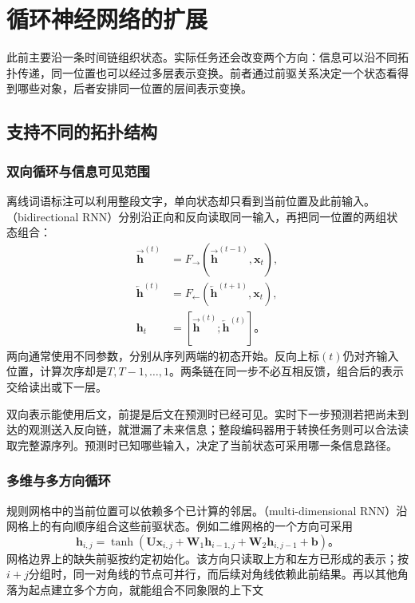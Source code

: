 \section{循环神经网络的扩展}
\label{sec:rnn-extensions}

此前主要沿一条时间链组织状态。实际任务还会改变两个方向：信息可以沿不同拓扑传递，同一位置也可以经过多层表示变换。前者通过前驱关系决定一个状态看得到哪些对象，后者安排同一位置的层间表示变换。

\subsection{支持不同的拓扑结构}
\label{sec:rnn-topologies}

\subsubsection{双向循环与信息可见范围}
\label{sec:rnn-bidirectional}

离线词语标注可以利用整段文字，单向状态却只看到当前位置及此前输入。（bidirectional RNN）分别沿正向和反向读取同一输入，再把同一位置的两组状态组合：
\begin{equation}
  \begin{aligned}
    \overrightarrow{\bm{h}}^{(t)}&=F_{\rightarrow}\!\left(
       \overrightarrow{\bm{h}}^{(t-1)},\bm{x}_t\right),\\
    \overleftarrow{\bm{h}}^{(t)}&=F_{\leftarrow}\!\left(
       \overleftarrow{\bm{h}}^{(t+1)},\bm{x}_t\right),\\
    \bm{h}_t&=[\overrightarrow{\bm{h}}^{(t)};
                 \overleftarrow{\bm{h}}^{(t)}]\text{。}
  \end{aligned}
  \label{eq:rnn-bidirectional}
\end{equation}
两向通常使用不同参数，分别从序列两端的初态开始。反向上标$(t)$仍对齐输入位置，计算次序却是$T,T-1,\ldots,1$。两条链在同一步不必互相反馈，组合后的表示交给读出或下一层。

双向表示能使用后文，前提是后文在预测时已经可见。实时下一步预测若把尚未到达的观测送入反向链，就泄漏了未来信息；整段编码器用于转换任务则可以合法读取完整源序列。预测时已知哪些输入，决定了当前状态可采用哪一条信息路径。

\subsubsection{多维与多方向循环}
\label{sec:rnn-multidimensional}

规则网格中的当前位置可以依赖多个已计算的邻居。（multi-dimensional RNN）沿网格上的有向顺序组合这些前驱状态。例如二维网格的一个方向可采用
\begin{equation}
  \bm{h}_{i,j}=\tanh\!\left(
     \bm{U}\bm{x}_{i,j}+\bm{W}_1\bm{h}_{i-1,j}
      +\bm{W}_2\bm{h}_{i,j-1}+\bm{b}\right)\text{。}
  \label{eq:rnn-multidimensional}
\end{equation}
网格边界上的缺失前驱按约定初始化。该方向只读取上方和左方已形成的表示；按$i+j$分组时，同一对角线的节点可并行，而后续对角线依赖此前结果。再以其他角落为起点建立多个方向，就能组合不同象限的上下文

